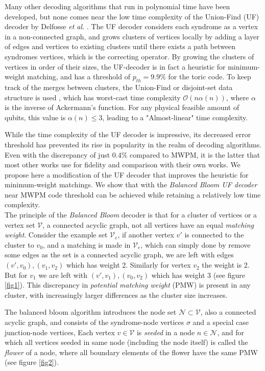 \documentclass[11pt, a4paper, twoside, titlepage, usenames,dvipsnames]{report}
\begin{document}
Many other decoding algorithms that run in polynomial time have been developed, but none comes near the low time complexity of the Union-Find (UF) decoder by Delfosse \emph{et al.} \cite{delfosse2017linear, delfosse2017almost}. The UF decoder considers each syndrome as a vertex in a non-connected graph, and grows clusters of vertices locally by adding a layer of edges and vertices to existing clusters until there exists a path between syndromes vertices, which is the correcting operator. By growing the clusters of vertices in order of their sizes, the UF-decoder is in fact a heuristic for minimum-weight matching, and has a threshold of $p_{th} = 9.9\%$ for the toric code. To keep track of the merges between clusters, the Union-Find or disjoint-set data structure is used \cite{tarjan1975efficiency}, which has worst-cast time complexity $\mathcal{O}(n\alpha(n))$, where $\alpha$ is the inverse of Ackermann's function. For any physical feasible amount of qubits, this value is $\alpha(n) \leq 3$, leading to a "Almost-linear" time complexity.

While the time complexity of the UF decoder is impressive, its decreased error threshold has prevented its rise in popularity in the realm of decoding algorithms. Even with the discrepancy of just $0.4\%$ compared to MWPM, it is the latter that most other works use for fidelity and comparison with their own works. We propose here a modification of the UF decoder that improves the heuristic for minimum-weight matchings. We show that with the \emph{Balanced Bloom UF decoder} near MWPM code threshold can be achieved while retaining a relatively low time complexity.\\

The principle of the \emph{Balanced Bloom} decoder is that for a cluster of vertices or a vertex set $\mathcal{V}$, a connected acyclic graph, not all vertices have an equal \emph{matching weight}. Consider the example set $\mathcal{V}_e$, if another vertex $v'$ is connected to the cluster to $v_0$, and a matching is made in $\mathcal{V}_e$, which can simply done by remove some edges as the set is a connected acyclic graph, we are left with edges $(v', v_0), (v_1, v_2)$ which has weight 2. Similarly for vertex $v_2$ the weight is 2. But for $v_1$ we are left with $(v', v_1), (v_0, v_2)$ which has weight 3 (see figure \ref{fig1}). This discrepancy in \emph{potential matching weight} (PMW) is present in any cluster, with increasingly larger differences as the cluster size increases.

The balanced bloom algorithm introduces the node set $\mathcal{N} \subset \mathcal{V}$, also a connected acyclic graph, and consists of the syndrome-node vertices $\sigma$ and a special case junction-node vertices, Each vertex $v \in \mathcal{V}$ is \emph{seeded} in a node $n\in \mathcal{N}$, and for which all vertices seeded in same node (including the node itself) is called the \emph{flower} of a node, where all boundary elements of the flower have the same PMW (see figure \ref{fig2}).
\end{document}

